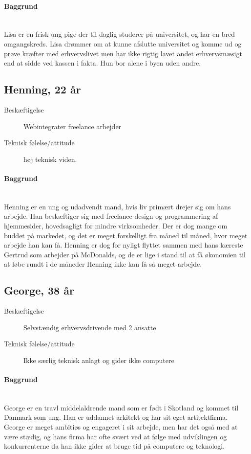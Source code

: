 \documentclass[a4paper,titlepage,fleqn,12pt]{article}
\begin{document}
\paragraph{Baggrund}\hfill\\Lisa er en frisk ung pige der til daglig studerer på universitet, og har en bred omgangskreds. Lisa drømmer om at kunne afslutte universitet og komme ud og prøve kræfter med erhvervslivet men har ikke rigtig lavet andet erhvervsmæsigt end at sidde ved kassen i fakta. Hun bor alene i byen uden andre.

\subsection{Henning, 22 år}
\begin{description}
	\item[Beskæftigelse] Webintegrater freelance arbejder
	\item[Teknisk følelse/attitude] høj teknisk viden.
\end{description}
\paragraph{Baggrund}\hfill\\Henning er en ung og udadvendt mand, hvis liv primært drejer sig om hans arbejde. Han beskæftiger sig med freelance design og programmering af hjemmesider, hovedsagligt for mindre virksomheder. Der er dog mange om buddet på markedet, og det er meget forskelligt fra måned til måned, hvor meget arbejde han kan få. Henning er dog for nyligt flyttet sammen med hans kæreste Gertrud som arbejder på McDonalds, og de er lige i stand til at få økonomien til at løbe rundt i de måneder Henning ikke kan få så meget arbejde.

\subsection{George, 38 år}
\begin{description}
	\item[Beskæftigelse] Selvstændig erhvervsdrivende med 2 ansatte
	\item[Teknisk følelse/attitude] Ikke særlig teknisk anlagt og gider ikke computere
\end{description}
\paragraph{Baggrund}\hfill\\
George er en travl middelaldrende mand som er født i Skotland og kommet til Danmark som ung. Han er uddannet arkitekt og har sit eget artitektfirma. George er meget ambitiøs og engageret i sit arbejde, men har det også med at være stædig, og hans firma har ofte svært ved at følge med udviklingen og konkurrenterne da han ikke gider at bruge tid på computere og teknologi. 
\end{document}
